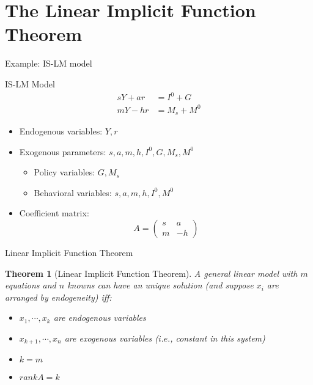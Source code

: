 \documentclass[final]{beamer}
\newtheorem{thm}{Theorem}
\begin{document}
\section{The Linear Implicit Function Theorem} %
\label{sec:the_linear_implicit_function_theorem}
\begin{frame}[t]{Example: IS-LM model}
	\begin{block}
		{IS-LM Model}
		\begin{align*}
			sY + ar &= I^0 + G \tag{IS}\\
			mY - hr &= M_s + M^0 \tag{LM} 
		\end{align*}
	\end{block}
	\begin{itemize}
		\item Endogenous variables: $Y,r$
		\item Exogenous parameters: $s,a,m,h,I^0,G,M_s,M^0$
		\begin{itemize}
			\item Policy variables: $G,M_s$
			\item Behavioral variables: $s,a,m,h,I^0,M^0$
		\end{itemize}
		\item Coefficient matrix:
		\[
			A=\begin{pmatrix}
				s&a\\m&-h
			\end{pmatrix}
		\]
	\end{itemize}
\end{frame}
\begin{frame}[t]{Linear Implicit Function Theorem}
	\begin{thm}
		[Linear Implicit Function Theorem]
		A general linear model with $m$ equations and $n$ knowns can have an unique solution (and suppose $x_i$ are arranged by endogeneity) iff:
		\begin{itemize}
			\item $x_1,\cdots,x_k$ are endogenous variables
			\item $x_{k+1},\cdots, x_n$ are exogenous variables ($i.e.$, constant in this system)
			\item $k=m$
			\item $rank A = k$
		\end{itemize}
	\end{thm}
\end{frame}
\end{document}
